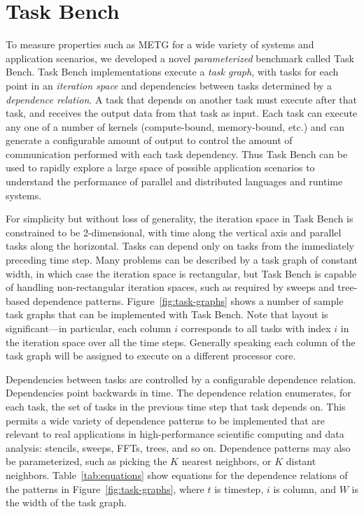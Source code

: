\section{Task Bench}
\label{sec:task-bench}



To measure properties such as METG for a wide variety of
systems and application scenarios, we developed a novel
\emph{parameterized} benchmark called Task Bench. Task Bench
implementations execute a \emph{task graph}, with tasks for each point
in an \emph{iteration space} and dependencies between tasks determined
by a \emph{dependence relation}. A task that depends on another task
must execute after that task, and receives the output data from that
task as input. Each task can execute any one of a
number of kernels (compute-bound, memory-bound, etc.) and can generate
a configurable amount of output to control the amount of communication
performed with each task dependency. Thus Task Bench can be used to
rapidly explore a large space of possible application scenarios to
understand the performance of parallel and
distributed languages and runtime systems.

For simplicity but without loss of generality, the iteration space in
Task Bench is constrained to be 2-dimensional, with time along
the vertical axis and parallel tasks along the
horizontal. Tasks can depend only on tasks from the immediately
preceding time step. Many problems can be described by a task graph of
constant width, in which case the iteration space is rectangular, but
Task Bench is capable of handling non-rectangular iteration spaces,
such as required by sweeps and tree-based dependence
patterns. Figure~\ref{fig:task-graphs} shows a number of sample task
graphs that can be implemented with Task Bench. Note that layout is
significant---in particular, each column $i$ corresponds to all tasks
with index $i$ in the iteration space over all the time
steps. Generally speaking each column of the task graph will be
assigned to execute on a different processor core.

Dependencies between tasks are controlled by a configurable dependence
relation. Dependencies point backwards in time. The
dependence relation enumerates, for each task, the set of tasks in the
previous time step that task depends on. This permits a wide variety
of dependence patterns to be implemented that are relevant to real
applications in high-performance scientific computing and data analysis: stencils,
sweeps, FFTs, trees, and so on. Dependence patterns may also be
parameterized, such as picking the $K$ nearest neighbors, or $K$
distant neighbors. Table~\ref{tab:equations} show equations for the
dependence relations of the patterns in Figure~\ref{fig:task-graphs},
where $t$ is timestep, $i$ is column, and $W$ is the width of the task
graph.

